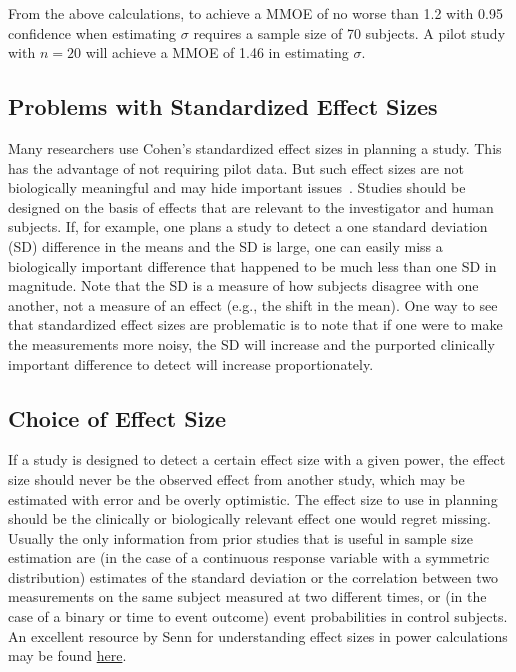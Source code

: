 From the above calculations, to achieve a MMOE of no worse than 1.2
with 0.95 confidence when estimating $\sigma$ requires a sample size
of 70 subjects.  A pilot study with $n=20$ will achieve a
MMOE of 1.46 in estimating $\sigma$.

\subsection{Problems with Standardized Effect Sizes}
Many researchers use Cohen's standardized effect sizes in planning a
study. This has the advantage of not requiring pilot data. But such
effect sizes are not biologically meaningful and may hide important
issues~\cite{len01som}. Studies should be designed on the basis
of effects that are relevant to the investigator and human
subjects. If, for example, one plans a study to detect a one standard
deviation (SD) difference in the means and the SD is large, one can
easily miss a biologically important difference that happened to be
much less than one SD in magnitude. Note that the SD is a measure of
how subjects disagree with one another, not a measure of an effect
(e.g., the shift in the mean).  One way to see that standardized
effect sizes are problematic is to note that if one were to make the
measurements more noisy, the SD will increase and the purported
clinically important difference to detect will increase proportionately.

\subsection{Choice of Effect Size}
If a study is designed to detect a certain effect size with a given
power, the effect size should never be the observed effect from
another study, which may be estimated with error and be overly
optimistic. The effect size to use in planning should be the
clinically or biologically relevant effect one would regret
missing.  Usually the only information from prior studies that is
useful in sample size estimation are (in the case of a continuous
response variable with a symmetric distribution) estimates of the
standard deviation or the correlation between two measurements on the
same subject measured at two different times, or (in the case of a
binary or time to event outcome) event probabilities in control
subjects.  An excellent resource by Senn for understanding effect
sizes in power calculations may be found \href{https://errorstatistics.com/2014/03/17/stephen-senn-on-how-to-interpret-discrepancies-against-which-a-test-has-high-power-guest-post/amp}{here}.


